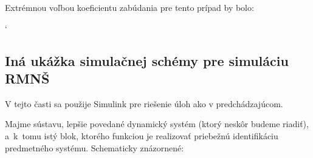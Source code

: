 \documentclass[a4paper, 10pt, ]{article}
\begin{document}
\noindent
Extrémnou voľbou koeficientu zabúdania pre tento prípad by bolo:


{\catcode`

}



\begin{centering}


    \vspace{-2mm}

    \figcaption{}

    \vspace{2mm}

    \label{figsc_ar03_fig03_2}

\end{centering}


































\subsection{Iná ukážka simulačnej schémy pre simuláciu RMNŠ}

V tejto časti sa použije Simulink pre riešenie úloh ako v predchádzajúcom.

\medskip

\noindent
Majme sústavu, lepšie povedané dynamický systém (ktorý neskôr budeme riadiť), a~k~tomu istý blok, ktorého funkciou je realizovať priebežnú identifikáciu predmetného systému. Schematicky znázornené:


\begin{centering}


    \vspace{-2mm}

    \figcaption{}

    \vspace{2mm}

    \label{sim_RMNS}

\end{centering}
\end{document}
